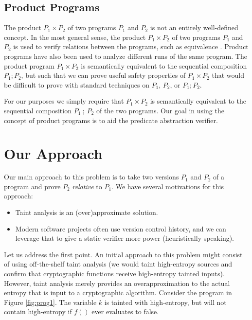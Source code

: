 \documentclass[letterpaper,twocolumn,10pt]{article}
\begin{document}
\subsection{Product Programs}

The product $P_1 \times P_2$ of two programs $P_1$ and $P_2$ is not an entirely well-defined concept. In the most general sense, the product $P_1 \times P_2$ of 
two programs $P_1$ and $P_2$ is used to verify
relations between the programs, such as equivalence \cite{barthe2011relational}. Product programs have also been used to analyze different runs of the same program. 
The product program $P_1 \times P_2$ is semantically equivalent to the sequential composition $P_1; P_2$, but such that we can prove useful 
safety properties of $P_1 \times P_2$ that would be difficult to 
prove with standard techniques on $P_1$, $P_2$, or $P_1; P_2$.

For our purposes we simply require that $P_1 \times P_2$ is semantically
equivalent to the sequential composition $P_1\ ;\ P_2$ of the two programs. Our goal in using the concept of product programs is to aid the predicate abstraction
verifier. 

\section{Our Approach}

Our main approach to this problem is to take two versions $P_1$ and $P_2$ of a program and prove $P_2$ \emph{relative} to $P_1$. We have several
motivations for this approach:

\begin{itemize}
    \item Taint analysis is an (over)approximate solution.
    \item Modern software projects often use version control history, and we can leverage that to give a static verifier more power (heuristically speaking).
\end{itemize}

Let us address the first point.
An initial approach to this problem
might consist of using off-the-shelf taint analysis (we would taint high-entropy sources and confirm that
cryptographic functions receive high-entropy tainted inputs). 
However, taint analysis merely provides an overapproximation to the actual entropy that is
input to a cryptographic algorithm. Consider the program in Figure
\ref{fig:prog1}. The variable $k$ is tainted with high-entropy, but will not contain high-entropy if $f()$ ever evaluates to false.
\end{document}
